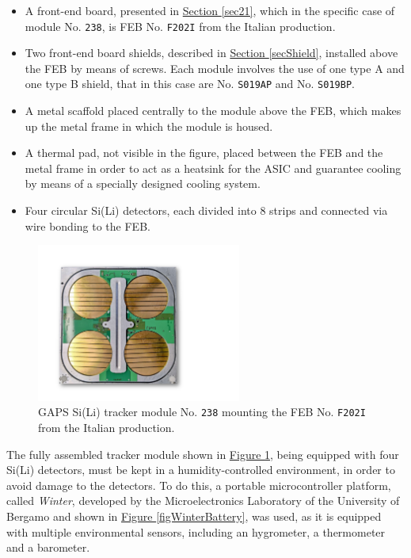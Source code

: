 \begin{itemize}
    \itemsep0em
    \item A front-end board, presented in \hyperref[sec21]{Section \ref{sec21}}, which in the specific case of module No. \texttt{238}, is FEB No. \texttt{F202I} from the Italian production.
    \item Two front-end board shields, described in \hyperref[secShield]{Section \ref{secShield}}, installed above the FEB by means of screws. Each module involves the use of one type A and one type B shield, that in this case are No. \texttt{S019AP} and No. \texttt{S019BP}.
    \item A metal scaffold placed centrally to the module above the FEB, which makes up the metal frame in which the module is housed.
    \item A thermal pad, not visible in the figure, placed between the FEB and the metal frame in order to act as a heatsink for the ASIC and guarantee cooling by means of a specially designed cooling system.
    \item Four circular Si(Li) detectors, each divided into 8 strips and connected via wire bonding to the FEB.
\end{itemize}

\begin{figure}[h!]
    \centering
    \includegraphics[width=0.6\textwidth]{Images/chap3/GAPS_module.pdf}
    \caption{GAPS Si(Li) tracker module No. \texttt{238} mounting the FEB No. \texttt{F202I} from the Italian production.}
    \label{figSILImodule}
\end{figure}

\par
The fully assembled tracker module shown in \hyperref[figSILImodule]{Figure \ref{figSILImodule}}, being equipped with four Si(Li) detectors, must be kept in a humidity-controlled environment, in order to avoid damage to the detectors. To do this, a portable microcontroller platform, called \textit{Winter}, developed by the Microelectronics Laboratory of the University of Bergamo and shown in \hyperref[figWinterBattery]{Figure \ref{figWinterBattery}}, was used, as it is equipped with multiple environmental sensors, including an hygrometer, a thermometer and a barometer. 

